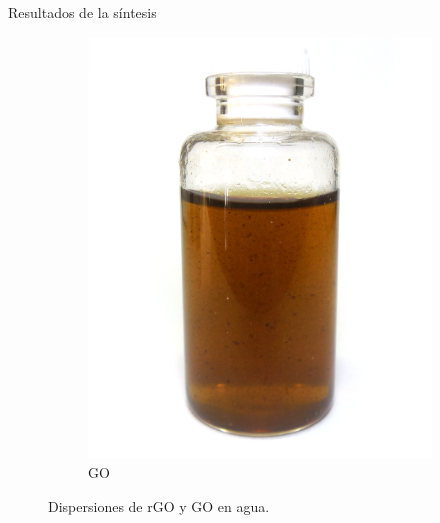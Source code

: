 \documentclass[aspectratio=169]{beamer}
\begin{document}
\begin{frame}{Resultados de la síntesis}
\begin{figure}[h]
{\begin{subfigure}{0.31\textwidth}
					\includegraphics[width=\textwidth]{GO_pic.png}
					\caption{GO}
					\label{fig:GO}
				\end{subfigure}
			}
			\caption[Dispersiones de rGO y GO en agua]{Dispersiones de rGO y GO en agua.}
			\label{fig:RGOyGO}
		\end{figure}
	\end{frame}
	
\end{document}
